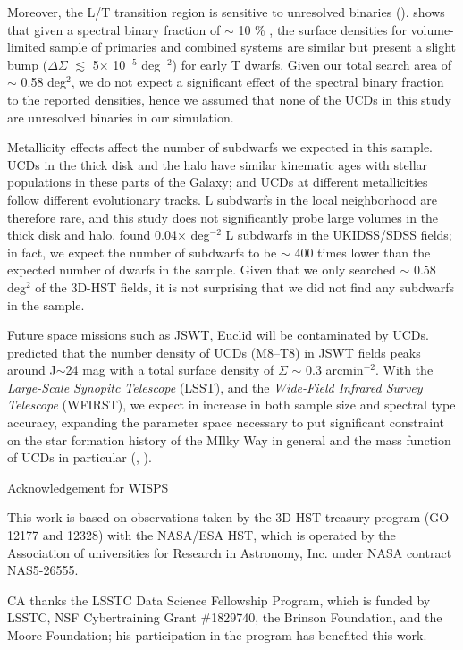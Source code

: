 \documentclass[manuscript]{aastex}
\begin{document}
Moreover, the L/T transition region is sensitive to unresolved binaries (\citealt{2014ApJ...794..143B}). \cite{2007ApJ...659..655B} shows that given a spectral binary fraction of $\sim$ 10 \% , the surface densities for volume-limited sample of primaries and combined systems are similar but present a slight bump ($\Delta \Sigma$ $\lesssim$ 5$\times$ 10$^{-5}$ deg$^{-2}$) for early T dwarfs. Given our total search area of $\sim$ 0.58 deg$^2$, we do not expect a significant effect of the spectral binary fraction to the reported densities, hence we assumed that none of the UCDs  in this study are unresolved binaries in our simulation.

Metallicity effects affect the number of subdwarfs we expected in this sample. UCDs in the thick disk and the halo have similar kinematic ages with stellar populations in these parts of the Galaxy; and UCDs at different metallicities follow different evolutionary tracks. L subdwarfs in the local neighborhood are therefore rare, and this study does not significantly probe large volumes in the thick disk and halo. \cite{Lodieu2017} found 0.04$\times$ deg$^{-2}$ L subdwarfs in the UKIDSS/SDSS fields; in fact, we expect the number of subdwarfs to be $\sim$ 400 times lower than the expected number of dwarfs in the sample. Given that we only searched $\sim$ 0.58 deg$^2$ of the 3D-HST fields, it is not surprising that we did not find any subdwarfs in the sample. 

Future space missions such as JSWT, Euclid will be contaminated by UCDs. \cite{RyanJr.2016} predicted that the number density of UCDs (M8--T8) in JSWT fields peaks around J$\sim$24 mag with a total surface density of $ \Sigma$ $\sim$ 0.3 arcmin$^{-2}$.  With the \textit{Large-Scale Synopitc Telescope} (LSST), and the \textit{Wide-Field Infrared Survey Telescope} (WFIRST), we expect in increase in both sample size and spectral type accuracy, expanding the parameter space necessary to put significant constraint on the star formation history of the MIlky Way in general and the mass function of UCDs in particular (\citealt{LSSTScienceCollaboration2009}, \citealt{Spergel2015}).

\acknowledgements
{\color{green} Acknowledgement for WISPS}

This work is based on observations taken by the 3D-HST treasury program (GO 12177 and 12328) with the NASA/ESA HST, which is operated by the Association of universities for Research in Astronomy, Inc. under NASA contract NAS5-26555.

CA thanks the LSSTC Data Science Fellowship Program, which is funded by LSSTC, NSF Cybertraining Grant \#1829740, the Brinson Foundation, and the Moore Foundation; his participation in the program has benefited this work.

\clearpage


%


 
\end{document}
